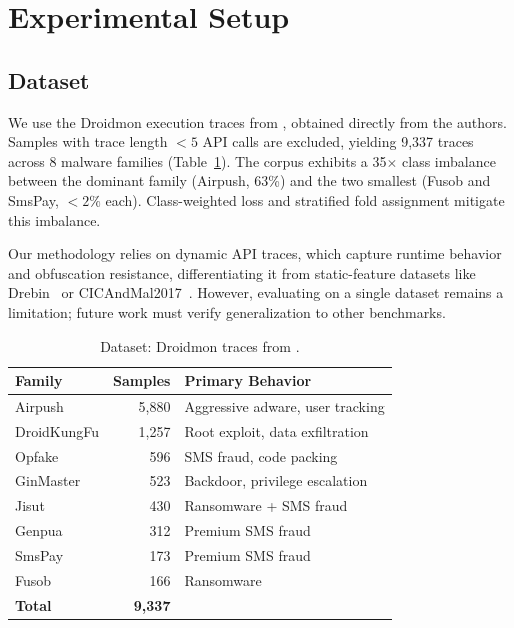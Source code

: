 \documentclass[12pt]{article}
\begin{document}
\section{Experimental Setup}
\label{sec:setup}

\subsection{Dataset}
We use the Droidmon execution traces from \citet{dangelo2023kspaced}, obtained directly from the authors.
Samples with trace length $< 5$ API calls are excluded, yielding 9,337
traces across 8 malware families (Table~\ref{tab:dataset}). The corpus
exhibits a 35$\times$ class imbalance between the dominant family
(Airpush, 63\%) and the two smallest (Fusob and SmsPay, $<2\%$ each).
Class-weighted loss and stratified fold assignment mitigate this imbalance.

Our methodology relies on dynamic API traces, which capture runtime behavior and obfuscation resistance, differentiating it from static-feature datasets like Drebin~\citep{drebin2014} or CICAndMal2017~\citep{lashkari2018cicandmal2017}. However, evaluating on a single dataset remains a limitation; future work must verify generalization to other benchmarks.

\begin{table}[t]
\centering
\caption{Dataset: Droidmon traces from \citet{dangelo2023kspaced}.}
\label{tab:dataset}
\begin{tabular}{lrl}
\toprule
\textbf{Family} & \textbf{Samples} & \textbf{Primary Behavior} \\
\midrule
Airpush      & 5,880 & Aggressive adware, user tracking \\
DroidKungFu  & 1,257 & Root exploit, data exfiltration \\
Opfake       &   596 & SMS fraud, code packing \\
GinMaster    &   523 & Backdoor, privilege escalation \\
Jisut        &   430 & Ransomware + SMS fraud \\
Genpua       &   312 & Premium SMS fraud \\
SmsPay       &   173 & Premium SMS fraud \\
Fusob        &   166 & Ransomware \\
\midrule
\textbf{Total} & \textbf{9,337} & \\
\bottomrule
\end{tabular}
\end{table}
\end{document}

